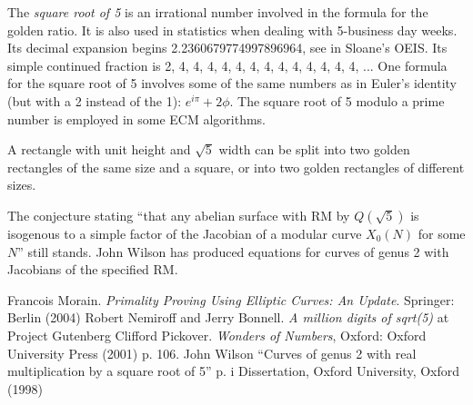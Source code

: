 \documentclass[12pt]{article}
\begin{document}
The \emph{square root of 5} is an irrational number involved in the formula for the golden ratio. It is also used in statistics when dealing with 5-business day weeks. Its decimal expansion begins 2.2360679774997896964, see  in Sloane's OEIS. Its simple continued fraction is 2, 4, 4, 4, 4, 4, 4, 4, 4, 4, 4, 4, 4, 4, ... One formula for the square root of 5 involves some of the same numbers as in Euler's identity (but with a 2 instead of the 1): $e^{i\pi}+2\phi$. The square root of 5 modulo a prime number is employed in some ECM algorithms.

A rectangle with unit height and $\sqrt{5}$ width can be split into two golden rectangles of the same size and a square, or into two golden rectangles of different sizes.

The conjecture stating ``that any abelian surface with RM by $Q(\sqrt{5})$ is isogenous to a simple factor of the Jacobian of a modular curve $X_0(N)$ for some $N$'' still stands. John Wilson has produced equations for curves of genus 2 with Jacobians of the specified RM.

\begin{thebibliography}{1}
 Francois Morain. {\it Primality Proving Using Elliptic Curves: An Update}. Springer: Berlin (2004)
 Robert Nemiroff and Jerry Bonnell. {\it A million digits of sqrt(5)} at Project Gutenberg 
 Clifford Pickover. {\it Wonders of Numbers}, Oxford: Oxford University Press (2001) p. 106.
 John Wilson  ``Curves of genus 2 with real multiplication by a square root of 5'' p. i Dissertation, Oxford University, Oxford (1998) 
\end{thebibliography}
\end{document}
